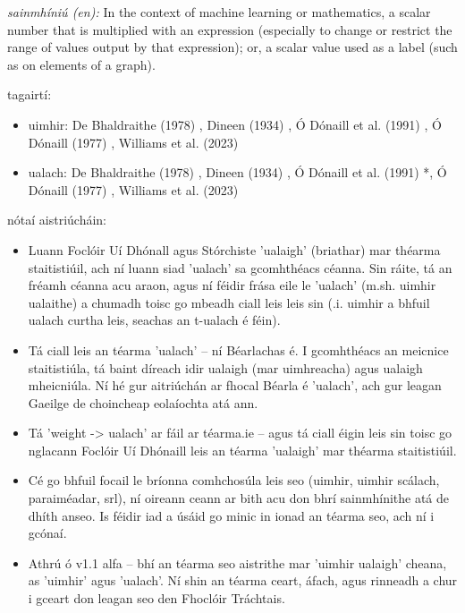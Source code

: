 \documentclass{article}
\begin{document}
\textit{sainmhíniú (en):} In the context of machine learning or mathematics, a scalar number that is multiplied with an expression (especially to change or restrict the range of values output by that expression); or, a scalar value used as a label (such as on elements of a graph).

tagairtí:
\begin{itemize}
	\item uimhir: De Bhaldraithe (1978) \cite{de-bhaldraithe}, Dineen (1934) \cite{dineen}, Ó Dónaill et al. (1991) \cite{focloir-beag}, Ó Dónaill (1977) \cite{odonaill}, Williams et al. (2023) \cite{storchiste}
	\item ualach: De Bhaldraithe (1978) \cite{de-bhaldraithe}, Dineen (1934) \cite{dineen}, Ó Dónaill et al. (1991) \cite{focloir-beag}*, Ó Dónaill (1977) \cite{odonaill}, Williams et al. (2023) \cite{storchiste}
\end{itemize}

nótaí aistriúcháin:
\begin{itemize}
	\item Luann Foclóir Uí Dhónall agus Stórchiste 'ualaigh' (briathar) mar théarma staitistiúil, ach ní luann siad 'ualach' sa gcomhthéacs céanna. Sin ráite, tá an fréamh céanna acu araon, agus ní féidir frása eile le 'ualach' (m.sh. uimhir ualaithe) a chumadh toisc go mbeadh ciall leis leis sin (.i. uimhir a bhfuil ualach curtha leis, seachas an t-ualach é féin).
	\item Tá ciall leis an téarma 'ualach' -- ní Béarlachas é. I gcomhthéacs an meicnice staitistiúla, tá baint díreach idir ualaigh (mar uimhreacha) agus ualaigh mheicniúla. Ní hé gur aitriúchán ar fhocal Béarla é 'ualach', ach gur leagan Gaeilge de choincheap eolaíochta atá ann.
	\item Tá 'weight -> ualach' ar fáil ar téarma.ie -- agus tá ciall éigin leis sin toisc go nglacann Foclóir Uí Dhónaill leis an téarma 'ualaigh' mar théarma staitistiúil. 
	\item Cé go bhfuil focail le bríonna comhchosúla leis seo (uimhir, uimhir scálach, paraiméadar, srl), ní oireann ceann ar bith acu don bhrí sainmhínithe atá de dhíth anseo. Is féidir iad a úsáid go minic in ionad an téarma seo, ach ní i gcónaí.
	\item Athrú ó v1.1 alfa -- bhí an téarma seo aistrithe mar 'uimhir ualaigh' cheana, as 'uimhir' agus 'ualach'. Ní shin an téarma ceart, áfach, agus rinneadh a chur i gceart don leagan seo den Fhoclóir Tráchtais.
\end{itemize}
\end{document}
